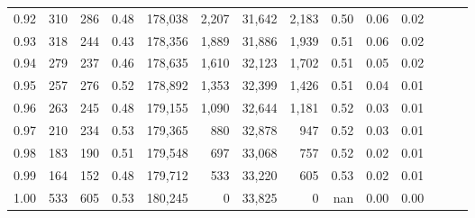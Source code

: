 \begin{tabular}{rrrrrrrrrrrrrr}
0.92 &    310 &  286 &  0.48 &  178,038 &    2,207 &  31,642 &   2,183 &  0.50 &  0.06 &      0.02 \\
0.93 &    318 &  244 &  0.43 &  178,356 &    1,889 &  31,886 &   1,939 &  0.51 &  0.06 &      0.02 \\
0.94 &    279 &  237 &  0.46 &  178,635 &    1,610 &  32,123 &   1,702 &  0.51 &  0.05 &      0.02 \\
0.95 &    257 &  276 &  0.52 &  178,892 &    1,353 &  32,399 &   1,426 &  0.51 &  0.04 &      0.01 \\
0.96 &    263 &  245 &  0.48 &  179,155 &    1,090 &  32,644 &   1,181 &  0.52 &  0.03 &      0.01 \\
0.97 &    210 &  234 &  0.53 &  179,365 &      880 &  32,878 &     947 &  0.52 &  0.03 &      0.01 \\
0.98 &    183 &  190 &  0.51 &  179,548 &      697 &  33,068 &     757 &  0.52 &  0.02 &      0.01 \\
0.99 &    164 &  152 &  0.48 &  179,712 &      533 &  33,220 &     605 &  0.53 &  0.02 &      0.01 \\
1.00 &    533 &  605 &  0.53 &  180,245 &        0 &  33,825 &       0 &   nan &  0.00 &      0.00 \\
\bottomrule
\end{tabular}
